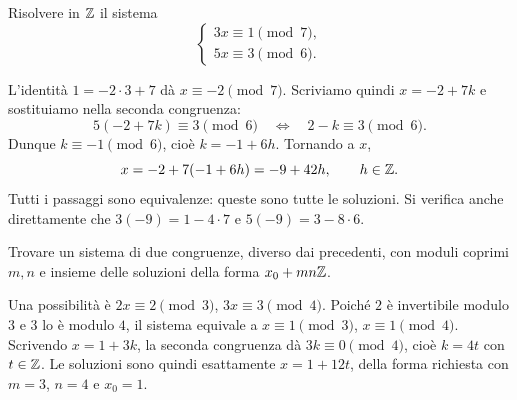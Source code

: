 \begin{esercizio}
Risolvere in $\mathbb{Z}$ il sistema
\[
\begin{cases}
3x\equiv1\pmod7,\\
5x\equiv3\pmod6.
\end{cases}
\]
\end{esercizio}
\begin{svolgimento}
L'identità $1=-2\cdot3+7$ dà $x\equiv-2\pmod7$. Scriviamo quindi $x=-2+7k$ e sostituiamo nella seconda congruenza:
\[
5(-2+7k)\equiv3\pmod6
\quad\Longleftrightarrow\quad 2-k\equiv3\pmod6.
\]
Dunque $k\equiv-1\pmod6$, cioè $k=-1+6h$. Tornando a $x$,
\[
x=-2+7(-1+6h)=-9+42h,\qquad h\in\mathbb{Z}.
\]
Tutti i passaggi sono equivalenze: queste sono tutte le soluzioni. Si verifica anche direttamente che $3(-9)=1-4\cdot7$ e $5(-9)=3-8\cdot6$.
\end{svolgimento}

\begin{esercizio}
Trovare un sistema di due congruenze, diverso dai precedenti, con moduli coprimi $m,n$ e insieme delle soluzioni della forma $x_0+mn\mathbb{Z}$.
\end{esercizio}
\begin{svolgimento}
Una possibilità è $2x\equiv2\pmod3$, $3x\equiv3\pmod4$. Poiché $2$ è invertibile modulo $3$ e $3$ lo è modulo $4$, il sistema equivale a $x\equiv1\pmod3$, $x\equiv1\pmod4$.
Scrivendo $x=1+3k$, la seconda congruenza dà $3k\equiv0\pmod4$, cioè $k=4t$ con $t\in\mathbb{Z}$. Le soluzioni sono quindi esattamente $x=1+12t$, della forma richiesta con $m=3$, $n=4$ e $x_0=1$.
\end{svolgimento}

